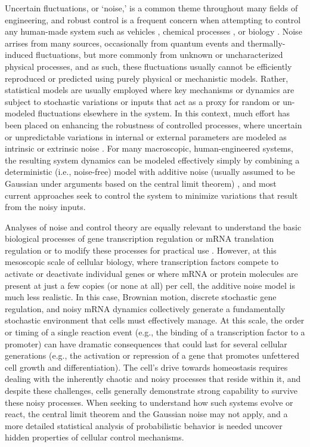 \documentclass[12pt]{iopart}
\begin{document}
Uncertain fluctuations, or `noise,' is a common theme throughout many fields of engineering, and robust control is a frequent concern when attempting to control any human-made system such as vehicles \cite{Liang2021}, chemical processes \cite{Lucia2013}, or biology \cite{Baetica2020}. Noise arrises from many sources, occasionally from quantum events and thermally-induced fluctuations, but more commonly from unknown or uncharacterized physical processes, and as such, these fluctuations usually cannot be efficiently reproduced or predicted using purely physical or mechanistic models.
Rather, statistical models are usually employed where key mechanisms or dynamics are subject to stochastic variations or inputs that act as a proxy for random or un-modeled fluctuations elsewhere in the system.
In this context, much effort has been placed on enhancing the robustness of controlled processes, where uncertain or unpredictable variations in internal or external parameters are modeled as intrinsic or extrinsic noise \cite{Bhattacharyya2017}.
For many macroscopic, human-engineered systems, the resulting system dynamics can be modeled effectively simply by combining a deterministic (i.e., noise-free) model with additive noise (usually assumed to be Gaussian under arguments based on the central limit theorem) \cite{Feng2022}, and most current approaches seek to control the system to minimize variations that result from the noisy inputs. 

Analyses of noise and control theory are equally relevant to understand the basic biological processes of gene transcription regulation \cite{Sun2020}or mRNA translation regulation \cite{Cialek2022}or to modify these processes for practical use \cite{Dionisi2022,Baumschlager2017}.
However, at this mesoscopic scale of cellular biology, where transcription factors compete to activate or deactivate individual genes or where mRNA or protein molecules are present at just a few copies (or none at all) per cell, the additive noise model is much less realistic.
In this case, Brownian motion, discrete stochastic gene regulation, and noisy mRNA dynamics collectively generate a fundamentally stochastic environment that cells must effectively manage. 
At this scale, the order or timing of a single reaction event (e.g., the binding of a transcription factor to a promoter) can have dramatic consequences that could last for several cellular generations (e.g., the activation or repression of a gene that promotes unfettered cell growth and differentiation). 
The cell's drive towards homeostasis requires dealing with the inherently chaotic and noisy processes that reside within it, and despite these challenges, cells generally demonstrate strong capability to survive these noisy processes. 
When seeking to understand how such systems evolve or react, the central limit theorem and the Gaussian noise may not apply, and a more detailed statistical analysis of probabilistic behavior is needed uncover hidden properties of cellular control mechanisms.
\end{document}

